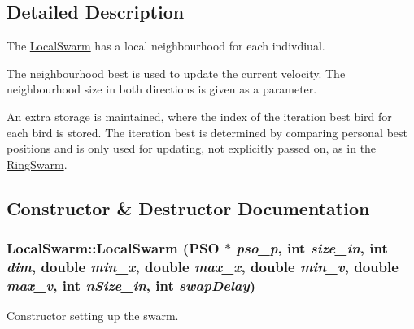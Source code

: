 \subsection{Detailed Description}
The \hyperlink{classLocalSwarm}{LocalSwarm} has a local neighbourhood for each indivdiual. 

The neighbourhood best is used to update the current velocity. The neighbourhood size in both directions is given as a parameter.\par
 An extra storage is maintained, where the index of the iteration best bird for each bird is stored. The iteration best is determined by comparing personal best positions and is only used for updating, not explicitly passed on, as in the \hyperlink{classRingSwarm}{RingSwarm}. 

\subsection{Constructor \& Destructor Documentation}
\hypertarget{classLocalSwarm_483bb3b9c79778185e8898b3f8aa9820}{
\subsubsection{\setlength{\rightskip}{0pt plus 5cm}LocalSwarm::LocalSwarm ({\bf PSO} $\ast$ {\em pso\_\-p}, \/  int {\em size\_\-in}, \/  int {\em dim}, \/  double {\em min\_\-x}, \/  double {\em max\_\-x}, \/  double {\em min\_\-v}, \/  double {\em max\_\-v}, \/  int {\em nSize\_\-in}, \/  int {\em swapDelay})}}
\label{classLocalSwarm_483bb3b9c79778185e8898b3f8aa9820}


Constructor setting up the swarm. 

